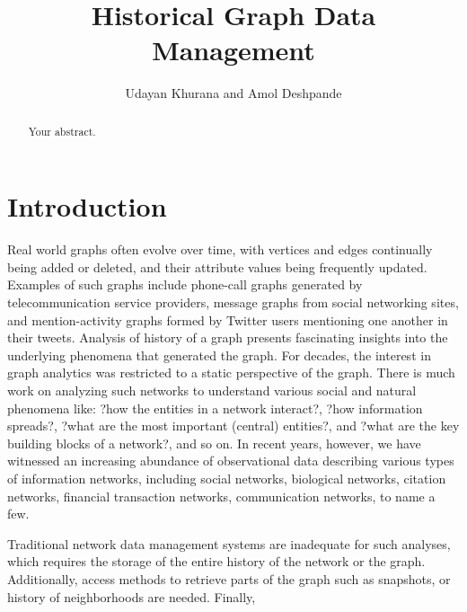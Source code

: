 \documentclass{svjour3}
\begin{document}
\title{Historical Graph Data Management}
\author{Udayan Khurana and Amol Deshpande}
%
%
\maketitle

\begin{abstract}
Your abstract.
\end{abstract}

\section{Introduction}
Real world graphs often evolve over time, with vertices and edges continually being added or deleted, and their attribute values being frequently updated. Examples of such graphs include phone-call graphs generated by telecommunication service providers, message graphs from social networking sites, and mention-activity graphs formed by Twitter users mentioning one another in their tweets.
Analysis of history of a graph presents fascinating insights into the underlying phenomena that generated the graph. 
For decades, the interest in graph analytics was restricted to a static perspective of the graph. There is much work on analyzing such networks to understand various social
and natural phenomena like: ?how the entities in a network interact?, ?how information
spreads?, ?what are the most important (central) entities?, and ?what are the key building
blocks of a network?, and so on. 
In recent years, however, we have witnessed an increasing abundance of observational data describing
various types of information networks, including social networks, biological networks,
citation networks, financial transaction networks, communication networks, to
name a few. 

Traditional network data management systems are inadequate for such analyses, which  
requires the storage of the entire history of the network or the graph. Additionally, access methods to retrieve parts of the graph such as snapshots, or history of neighborhoods are needed. Finally, 
\end{document}
